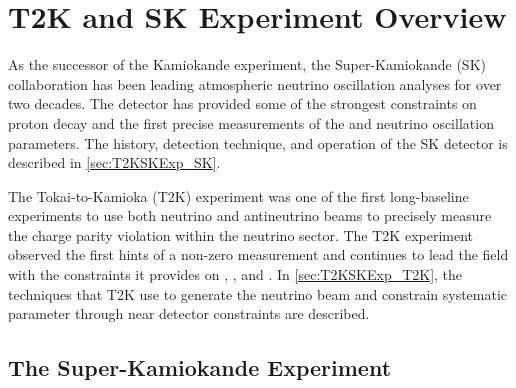 \chapter{T2K and SK Experiment Overview}
\label{chap:T2KSKExp}

As the successor of the Kamiokande experiment, the Super-Kamiokande (SK) collaboration has been leading atmospheric neutrino oscillation analyses for over two decades. The detector has provided some of the strongest constraints on proton decay and the first precise measurements of the \delmsqatm and \sinsqatm neutrino oscillation parameters.
The history, detection technique, and operation of the SK detector is described in \autoref{sec:T2KSKExp_SK}.

The Tokai-to-Kamioka (T2K) experiment was one of the first long-baseline experiments to use both neutrino and antineutrino beams to precisely measure the charge parity violation within the neutrino sector. The T2K experiment observed the first hints of a non-zero \sinsqreac measurement and continues to lead the field with the constraints it provides on \sinsqreac, \sinsqatm, \delmsqatm and \dcp.
In \autoref{sec:T2KSKExp_T2K}, the techniques that T2K use to generate the neutrino beam and constrain systematic parameter through near detector constraints are described.


\section{The Super-Kamiokande Experiment}
\label{sec:T2KSKExp_SK}

